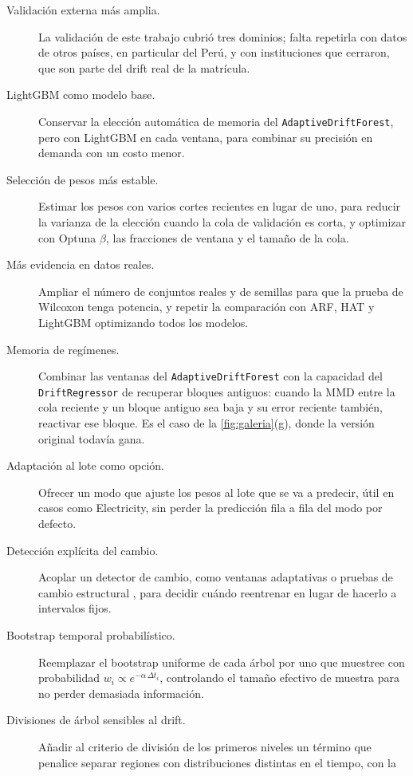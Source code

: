 \documentclass[11pt,a4paper]{article}
\begin{document}
\begin{description}
  \item[Validación externa más amplia.] La validación de este trabajo cubrió tres dominios; falta
  repetirla con datos de otros países, en particular del Perú, y con instituciones que cerraron, que son
  parte del drift real de la matrícula.
  \item[LightGBM como modelo base.] Conservar la elección automática de memoria del
  \texttt{AdaptiveDriftForest}, pero con LightGBM en cada ventana, para combinar su precisión en demanda
  con un costo menor.
  \item[Selección de pesos más estable.] Estimar los pesos con varios cortes recientes en lugar de
  uno, para reducir la varianza de la elección cuando la cola de validación es corta, y optimizar con
  Optuna $\beta$, las fracciones de ventana y el tamaño de la cola.
  \item[Más evidencia en datos reales.] Ampliar el número de conjuntos reales y de semillas para que
  la prueba de Wilcoxon tenga potencia, y repetir la comparación con ARF, HAT y LightGBM optimizando
  todos los modelos.
  \item[Memoria de regímenes.] Combinar las ventanas del \texttt{AdaptiveDriftForest} con la capacidad
  del \texttt{DriftRegressor} de recuperar bloques antiguos: cuando la MMD entre la cola reciente y un
  bloque antiguo sea baja y su error reciente también, reactivar ese bloque. Es el caso de la
  \cref{fig:galeria}(g), donde la versión original todavía gana.
  \item[Adaptación al lote como opción.] Ofrecer un modo que ajuste los pesos al lote que se va a
  predecir, útil en casos como Electricity, sin perder la predicción fila a fila del modo por
  defecto.
  \item[Detección explícita del cambio.] Acoplar un detector de cambio, como ventanas adaptativas
  \parencite{bifet2007} o pruebas de cambio estructural \parencite{baiperron1998}, para decidir
  cuándo reentrenar en lugar de hacerlo a intervalos fijos.
  \item[Bootstrap temporal probabilístico.] Reemplazar el bootstrap uniforme de cada árbol por uno
  que muestree con probabilidad $w_i \propto e^{-\alpha\,\Delta t_i}$, controlando el tamaño efectivo
  de muestra para no perder demasiada información.
  \item[Divisiones de árbol sensibles al drift.] Añadir al criterio de división de los primeros
  niveles un término que penalice separar regiones con distribuciones distintas en el tiempo, con la

\end{description}
\end{document}
